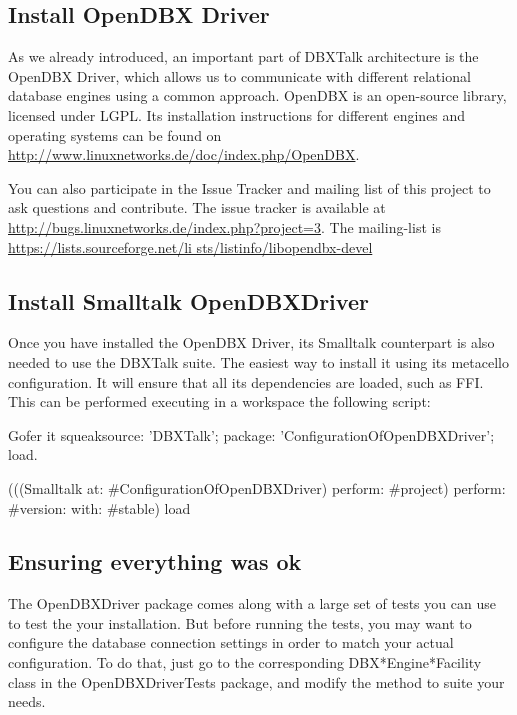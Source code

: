 \documentclass[a4paper,10pt,twoside]{book}
\begin{document}
\subsection*{Install OpenDBX Driver}

As we already introduced, an important part of DBXTalk architecture is the OpenDBX Driver, which allows us
to communicate with different relational database engines using a common approach.  OpenDBX is an open-source library,
licensed under LGPL. Its installation instructions for different engines and operating systems can be found on \url{http://www.linuxnetworks.de/doc/index.php/OpenDBX}.


You can also participate in the Issue Tracker and mailing list of this project to ask questions and contribute. The issue tracker is available at \url{http://bugs.linuxnetworks.de/index.php?project=3}. The mailing-list is \url{https://lists.sourceforge.net/li sts/listinfo/libopendbx-devel}

\subsection*{Install Smalltalk OpenDBXDriver}
Once you have installed the OpenDBX Driver, its Smalltalk counterpart is also needed to use the DBXTalk suite.  The easiest way to install it using its metacello configuration. It will ensure that all its dependencies are loaded, such as FFI.  This can be performed executing in a workspace the following script:

\begin{code}{}
Gofer it
	squeaksource: 'DBXTalk';
	package: 'ConfigurationOfOpenDBXDriver';
	load.
	
(((Smalltalk at: #ConfigurationOfOpenDBXDriver) perform: #project) perform: #version: with: #stable) load
\end{code}

\subsection*{Ensuring everything was ok}

The OpenDBXDriver package comes along with a large set of tests you can use to test the your installation.  But before running
 the tests, you may want to configure the database connection settings in order to match your actual configuration.
To do that, just go to the corresponding DBX*Engine*Facility class in the OpenDBXDriverTests package, and modify the
 method to suite your needs.
\end{document}
